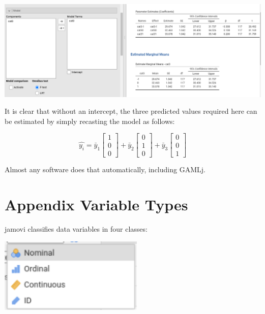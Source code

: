 \documentclass[
]{book}
\begin{document}
\includegraphics[width=17.32in]{bookletpics/ap_a_output2}

It is clear that without an intercept, the three predicted values required here can be estimated by simply recasting the model as follows:

\[
\hat{y_i}=\bar{y}_1 \begin{bmatrix}
1 \\
0 \\
0
\end{bmatrix} +\bar{y}_2 \begin{bmatrix}
0 \\
1 \\
0
\end{bmatrix}+
\bar{y}_3 \begin{bmatrix}
0 \\
0 \\
1
\end{bmatrix}
\]

Almost any software does that automatically, including {GAMLj}.

\hypertarget{appendixb}{%
\chapter{Appendix Variable Types}\label{appendixb}}

{jamovi} classifies data variables in four classes:

\includegraphics[width=2.71in]{bookletpics/a_vartypes}
\end{document}
